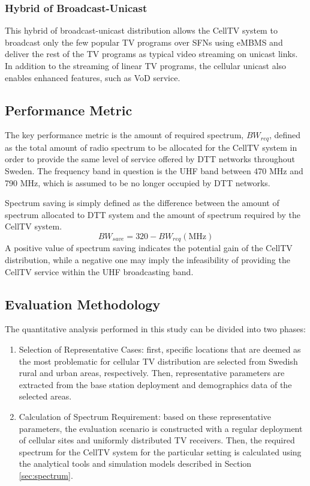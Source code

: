 \documentclass[journal]{IEEEtran}
\begin{document}
\subsubsection{\textbf{Hybrid of Broadcast-Unicast}}
This hybrid of broadcast-unicast distribution allows the CellTV system to broadcast only the few popular TV programs over SFNs using eMBMS and deliver the rest of the TV programs as typical video streaming on unicast links. In addition to the streaming of linear TV programs, the cellular unicast also enables enhanced features, such as VoD service.

\subsection{Performance Metric}
The key performance metric is the amount of required spectrum, $BW_{req}$, defined as the total amount of radio spectrum to be allocated for the CellTV system in order to provide the same level of service offered by DTT networks throughout Sweden. The frequency band in question is the UHF band between 470 MHz and 790 MHz, which is assumed to be no longer occupied by DTT networks.

Spectrum saving is simply defined as the difference between the amount of spectrum allocated to DTT system and the amount of spectrum required by the CellTV system.
\begin{equation}\label{BW_save}
  	BW_{save}=320-BW_{req}	\mathrm{(MHz)}
\end{equation}	
A positive value of spectrum saving indicates the potential gain of the CellTV distribution, while a negative one may imply the infeasibility of providing the CellTV service within the UHF broadcasting band.



\subsection{Evaluation Methodology}
\label{sec:Methodology}

The quantitative analysis performed in this study can be divided into two phases:
\begin{enumerate}
  \item 	{Selection of Representative Cases}: first, specific locations that are deemed as the most problematic for cellular TV distribution are selected from Swedish rural and urban areas, respectively. Then, representative parameters are extracted from the base station deployment and demographics data of the selected areas.

  \item {Calculation of Spectrum Requirement}: based on these representative parameters, the evaluation scenario is constructed with a regular deployment of cellular sites and uniformly distributed TV receivers. Then, the required spectrum for the CellTV system for the particular setting is calculated using the analytical tools and simulation models described in Section \ref{sec:spectrum}.
\end{enumerate}
\end{document}
